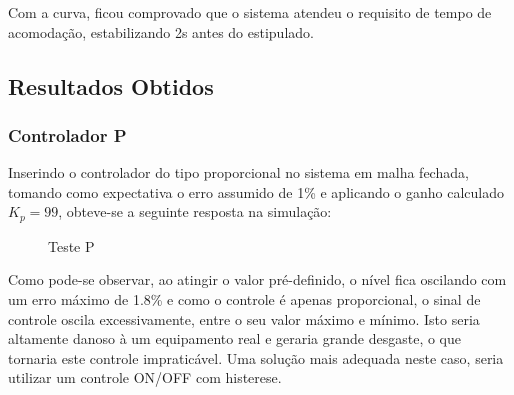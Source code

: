\documentclass[
	article,			%
	11pt,				%
	oneside,			%
	a4paper,			%
	section=TITLE,		%
	english,			%
	brazil,				%
	sumario=tradicional
	]{abntex2}
\newcommand{\xPID}{130}%
\newcommand{\yPID}{1.2}%
\begin{document}
Com a curva, ficou comprovado que o sistema atendeu o requisito de tempo de acomodação, estabilizando 2s antes do estipulado. 
\subsection{Resultados Obtidos}
\subsubsection{Controlador P}
Inserindo o controlador do tipo proporcional no sistema em malha fechada, tomando como expectativa o erro assumido de 1\% e aplicando o ganho calculado $K_p = 99$, obteve-se a seguinte resposta na simulação:

\begin{figure}[H]
    \centering
    \caption{Teste P}
    \label{fig:comp-modelos-P}
\end{figure}

Como pode-se observar, ao atingir o valor pré-definido, o nível fica oscilando com um erro máximo de 1.8\% e como o controle é apenas proporcional, o sinal de controle oscila excessivamente, entre o seu valor máximo e mínimo. Isto seria altamente danoso à um equipamento real e geraria grande desgaste, o que tornaria este controle impraticável. Uma solução mais adequada neste caso, seria utilizar um controle ON/OFF com histerese. 

\end{document}
